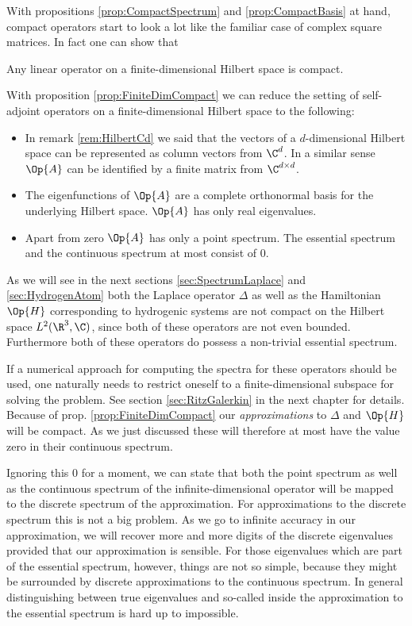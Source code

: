 With propositions \ref{prop:CompactSpectrum} and \ref{prop:CompactBasis}
at hand, compact operators start to look a lot like the familiar case
of complex square matrices.
In fact one can show that
\begin{prop}
	\label{prop:FiniteDimCompact}
	Any linear operator on a finite-dimensional Hilbert space is compact.
\end{prop}

\begin{rem}
With proposition \ref{prop:FiniteDimCompact}
we can reduce the setting of self-adjoint operators on a finite-dimensional
Hilbert space to the following:
\begin{itemize}
	\item In remark \vref{rem:HilbertCd} we said that the vectors
		of a $d$-dimensional Hilbert space
		can be represented as column vectors from $\C^d$.
		In a similar sense $\Op{A}$ can be identified by a finite matrix from
		$\C^{d \times d}$.
	\item The eigenfunctions of $\Op{A}$ are a complete orthonormal
		basis for the underlying Hilbert space.
		$\Op{A}$ has only real eigenvalues.
	\item Apart from zero $\Op{A}$ has only a point spectrum.
		The essential spectrum and the continuous spectrum at most consist of $0$.
\end{itemize}
\end{rem}

\begin{rem}
As we will see in the next sections \vref{sec:SpectrumLaplace}
and \vref{sec:HydrogenAtom} both the Laplace operator $\Delta$ as well as the
Hamiltonian $\Op{H}$ corresponding to hydrogenic systems
are not compact on the Hilbert space $L^2(\R^3, \C)$,
since both of these operators are not even bounded.
Furthermore both of these operators do possess a non-trivial essential spectrum.

If a numerical approach for computing the spectra for these operators
should be used,
one naturally needs to restrict oneself to a finite-dimensional subspace
for solving the problem.
See section \vref{sec:RitzGalerkin} in the next chapter for details.
Because of prop. \vref{prop:FiniteDimCompact} our \emph{approximations}
to $\Delta$ and $\Op{H}$ will be compact.
As we just discussed these will therefore
at most have the value zero in their continuous spectrum.

Ignoring this $0$ for a moment,
we can state that
both the point spectrum as well as the continuous spectrum
of the infinite-dimensional operator will be mapped to the discrete
spectrum of the approximation.
For approximations to the discrete spectrum this is not a big problem.
As we go to infinite accuracy in our approximation,
we will recover more and more digits of the discrete eigenvalues
provided that our approximation is sensible.
For those eigenvalues which are part of the essential spectrum, however,
things are not so simple, because they might be surrounded by
discrete approximations to the continuous spectrum.
In general distinguishing between true eigenvalues
and so-called  inside the approximation
to the essential spectrum is hard up to impossible.
\end{rem}

